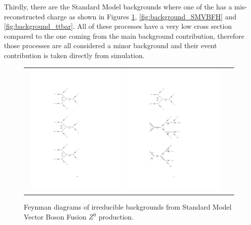 Thirdly, there are the Standard Model backgrounds where one of the \hadtau has a mis-reconstructed charge as shown in Figures \ref{fig:background_SMVBFZ0}, \ref{fig:background_SMVBFH} and \ref{fig:background_ttbar}. All of these processes have a very low cross section compared to the one coming from the main background contribution, therefore those processes are all considered a minor background and their event contribution is taken directly from simulation.

\begin{figure}[tbh!]
	\centering
	\begin{tabular}{cc}
		\includegraphics[width=0.48\textwidth]{diagrams/pics/background_SMVBFZ0Z0.pdf}
		\includegraphics[width=0.48\textwidth]{diagrams/pics/background_SMVBFZ0W.pdf} 		
	\end{tabular}
	\caption{Feynman diagrams of irreducible backgrounds from Standard Model Vector Boson Fusion $Z^{0}$ production. }
	\label{fig:background_SMVBFZ0}
\end{figure}

